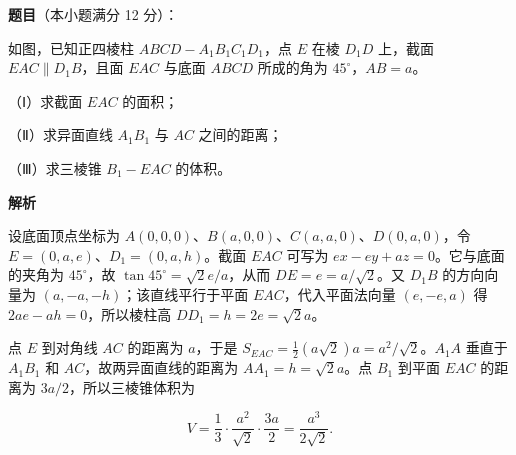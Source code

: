 \begin{answer}

\textbf{题目}（本小题满分 12 分）：

如图，已知正四棱柱 $ABCD-A_1B_1C_1D_1$，点 $E$ 在棱 $D_1D$ 上，截面 $EAC\parallel D_1B$，且面 $EAC$ 与底面 $ABCD$ 所成的角为 $45^\circ$，$AB=a$。

（Ⅰ）求截面 $EAC$ 的面积；

（Ⅱ）求异面直线 $A_1B_1$ 与 $AC$ 之间的距离；

（Ⅲ）求三棱锥 $B_1-EAC$ 的体积。
\nopagebreak[4]
\begin{center}\end{center}
\nopagebreak[4]
\textbf{解析}

设底面顶点坐标为 $A(0,0,0)$、$B(a,0,0)$、$C(a,a,0)$、$D(0,a,0)$，令 $E=(0,a,e)$、$D_1=(0,a,h)$。截面 $EAC$ 可写为 $ex-ey+az=0$。它与底面的夹角为 $45^\circ$，故 $\tan45^\circ=\sqrt2e/a$，从而 $DE=e=a/\sqrt2$。又 $D_1B$ 的方向向量为 $(a,-a,-h)$；该直线平行于平面 $EAC$，代入平面法向量 $(e,-e,a)$ 得 $2ae-ah=0$，所以棱柱高 $DD_1=h=2e=\sqrt2a$。

点 $E$ 到对角线 $AC$ 的距离为 $a$，于是 $S_{EAC}=\frac12(a\sqrt2)a=a^2/\sqrt2$。$A_1A$ 垂直于 $A_1B_1$ 和 $AC$，故两异面直线的距离为 $AA_1=h=\sqrt2a$。点 $B_1$ 到平面 $EAC$ 的距离为 $3a/2$，所以三棱锥体积为

\nopagebreak[4]
\[
V=\frac13\cdot\frac{a^2}{\sqrt2}\cdot\frac{3a}{2}=\frac{a^3}{2\sqrt2}.
\]


\end{answer}
